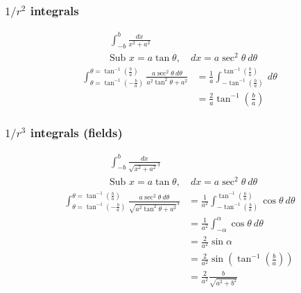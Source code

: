 \documentclass{article}
\begin{document}
\subsubsection{$1/r^2$ integrals}
\begin{align}
& \int_{-b}^b \frac{d x}{{x^2+a^2}} \\
& \text{Sub } x=a \tan \theta, \quad d x=a \sec ^2 \theta\ d \theta 
\end{align}
\begin{align}
\int_{\theta=\tan ^{-1}\left(-\frac{b}{a}\right)}^{\theta=\tan ^{-1}\left(\frac{b}{a}\right)} \frac{a \sec ^2 \theta\ d \theta}{{a^2 \tan ^2 \theta+a^2}} &= \frac{1}{a} \int_{-\tan ^{-1}\left(\frac{b}{a}\right)}^{\tan ^{-1}\left(\frac{b}{a}\right)}\ d \theta \\ 
& = \frac{2}{a} \tan^{-1}\left(\frac{b}{a}\right)
\end{align}
\subsubsection{$1/r^3$ integrals (fields)}
\begin{align}
& \int_{-b}^b \frac{d x}{\sqrt{x^2+a^2}^3 } \\
& \text{Sub } x=a \tan \theta, \quad d x=a \sec ^2 \theta\ d \theta 
\end{align}
\begin{align}
\int_{\theta=\tan ^{-1}\left(-\frac{b}{a}\right)}^{\theta=\tan ^{-1}\left(\frac{b}{a}\right)} \frac{a \sec ^2 \theta\ d \theta}{\sqrt{a^2 \tan ^2 \theta+a^2}^3 } &= \frac{1}{a^2}\int_{-\tan ^{-1}\left(\frac{b}{a}\right)}^{\tan ^{-1}\left(\frac{b}{a}\right)} \cos \theta \ d \theta \\ 
& =\frac{1}{a^2} \int_{-\alpha}^\alpha \cos \theta\ d \theta \\
&= \frac{2}{a^2} \sin \alpha \\
&= \frac{2}{a^2} \sin \left( \tan^{-1} \left( \frac{b}{a} \right) \right)\\
&= \frac{2}{a^2} \frac{b}{\sqrt{a^2 + b^2}} 
\end{align}
\clearpage
\end{document}
